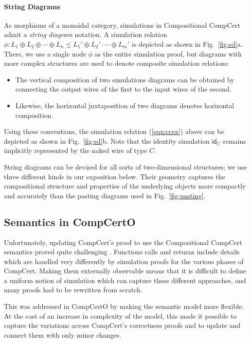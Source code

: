 \documentclass[acmsmall,screen,review,anonymous]{acmart}
\newcommand{\kw}[1]{\ensuremath{ \mathsf{#1} }}
\begin{document}
\paragraph{String Diagrams} %

As morphisms of a monoidal category,
simulations in Compositional CompCert
admit a \emph{string diagram} notation.
A simulation relation
$
  \phi : L_1 \oplus L_2 \oplus \cdots \oplus L_n \le
        L_1' \oplus L_2' \cdot \cdots \oplus L_m'
$
is depicted as shown in Fig.~\ref{fig:sd}a.
There, we use a single node $\phi$
as the entire simulation proof,
but diagrams with more complex structures
are used to denote composite simulation relations:
\begin{itemize}
\item
The vertical composition of two simulations diagrams
can be obtained by connecting the output wires of the first
to the input wires of the second.
\item
Likewise,
the horizontal juxtaposition of two diagrams
denotes horizontal composition.
\end{itemize}
Using these conventions,
the simulation relation (\ref{eqn:ccex}) above can be depicted
as shown in Fig.~\ref{fig:sd}b.
Note that the identity simulation $\kw{id}_C$
remains implicitly represented by the naked wire of type $C$.

String diagrams can be devised for all sorts of 
two-dimensional structures;
we use three different kinds in our exposition below.
Their geometry
captures the compositional structure and properties
of the underlying objects
more compactly and accurately
than the pasting diagrams
used in Fig.~\ref{fig:pasting}.


\subsection{Semantics in CompCertO} %

Unfortunately,
updating CompCert's proof to use the
Compositional CompCert semantics
proved quite challenging \citep{compcompcert}.
Functions calls and returns include details
which are handled very differently by simulation proofs
for the various phases of CompCert.
Making them externally observable means that
it is difficult to define a uniform notion of simulation
which can capture these different approaches,
and many proofs had to be rewritten from scratch.

This was addressed in CompCertO \citep{compcerto}
by making the semantic model more flexible.
At the cost of an increase in complexity of the model,
this made it possible to capture the variations across
CompCert's correctness proofs and to update and connect them
with only minor changes.
\end{document}
